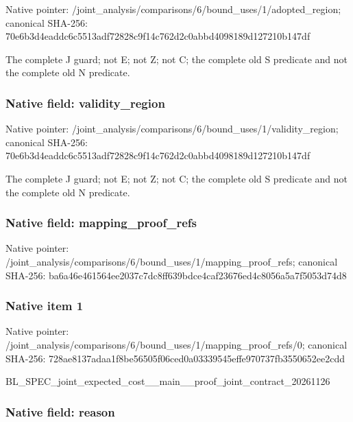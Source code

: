 \documentclass[10pt,a4paper]{article}
\begin{document}
Native pointer: /joint\_analysis/comparis\allowbreak{}ons/6/bound\_uses/1/adopt\allowbreak{}ed\_region; canonical SHA-256: 70e6b3d4eaddc6c5513adf72\allowbreak{}828c9f14c762d2c0abbd4098\allowbreak{}189d127210b147df


The complete J guard; not E; not Z; not C; the complete old S predicate and not the complete old N predicate.


\subsubsection{Native field: validity\_region}


Native pointer: /joint\_analysis/comparis\allowbreak{}ons/6/bound\_uses/1/valid\allowbreak{}ity\_region; canonical SHA-256: 70e6b3d4eaddc6c5513adf72\allowbreak{}828c9f14c762d2c0abbd4098\allowbreak{}189d127210b147df


The complete J guard; not E; not Z; not C; the complete old S predicate and not the complete old N predicate.


\subsubsection{Native field: mapping\_proof\_refs}


Native pointer: /joint\_analysis/comparis\allowbreak{}ons/6/bound\_uses/1/mappi\allowbreak{}ng\_proof\_refs; canonical SHA-256: ba6a46e461564ee2037c7dc8\allowbreak{}ff639bdce4caf23676ed4c80\allowbreak{}56a5a7f5053d74d8



\subsubsection{Native item 1}


Native pointer: /joint\_analysis/comparis\allowbreak{}ons/6/bound\_uses/1/mappi\allowbreak{}ng\_proof\_refs/0; canonical SHA-256: 728ae8137adaa1f8be56505f\allowbreak{}06ced0a03339545effe97073\allowbreak{}7fb3550652ee2cdd


BL\_SPEC\_joint\_expected\_c\allowbreak{}ost\_\_main\_\_proof\_joint\_c\allowbreak{}ontract\_20261126


\subsubsection{Native field: reason}
\end{document}

